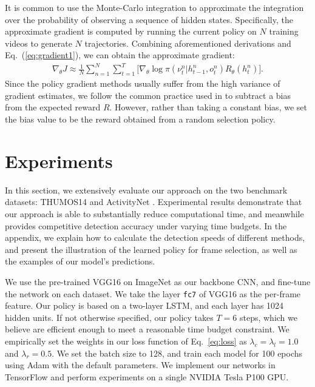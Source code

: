 \documentclass{bmvc2k}
\begin{document}
It is common to use the Monte-Carlo integration to approximate the integration over the probability of observing a sequence of hidden states. Specifically, the approximate gradient is computed by running the current policy on $N$ training videos to generate $N$ trajectories. Combining aforementioned derivations and Eq.~(\ref{eq:gradient1}), we can obtain the approximate gradient:
\begin{eqnarray}
\label{eq:gradient1-2}
\nabla_\theta J \approx  \frac{1}{N} \sum_{n=1}^N \sum_{t=1}^T \big[\nabla_{\theta} \log \pi(\nu_t^n | h_{t-1}^n, o_t^n) R_{\theta}(h_t^n) \big].
\end{eqnarray}
\noindent Since the policy gradient methods usually suffer from the high variance of gradient estimates, we follow the common practice used in \cite{williams1992simple} to subtract a bias from the expected reward $R$. However, rather than taking a constant bias, we set the bias value to be the reward obtained from a random selection policy.


\section{Experiments}


In this section, we extensively evaluate our approach on the two benchmark datasets: THUMOS14 \cite{THUMOS14} and ActivityNet \cite{caba2015activitynet}. Experimental results demonstrate that our approach is able to substantially reduce computational time, and meanwhile provides competitive detection accuracy under varying time budgets. In the appendix, we explain how to calculate the detection speeds of different methods, and present the illustration of the learned policy for frame selection, as well as the examples of our model's predictions. 

We use the pre-trained VGG16 \cite{simonyan2014very} on ImageNet as our backbone CNN, and fine-tune the network on each dataset. We take the layer \texttt{fc7} of VGG16 as the per-frame feature. Our policy is based on a two-layer LSTM, and each layer has 1024 hidden units. If not otherwise specified, our policy takes $T = 6$ steps, which we believe are efficient enough to meet a reasonable time budget constraint. We empirically set the weights in our loss function of Eq.~\eqref{eq:loss} as $\lambda_{c} = \lambda_{l} = 1.0$ and $\lambda_{r} = 0.5$. We set the batch size to 128, and train each model for 100 epochs using Adam with the default parameters. We implement our networks in TensorFlow and perform experiments on a single NVIDIA Tesla P100 GPU.
\end{document}
